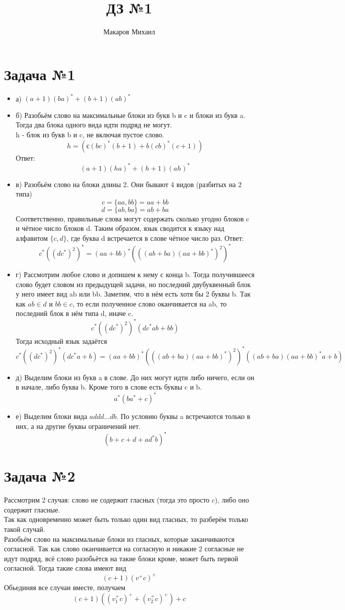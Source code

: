 \documentclass{article}
\title{ДЗ №1}
\author{Макаров Михаил}
\date{}
\begin{document}
	\maketitle
	\section{Задача №1}
	\begin{itemize}
	\item а) \( (a + 1)(ba)^* + (b + 1)(ab)^* \)
	\item б) Разобьём слово на максимальные блоки из букв b и c и блоки из букв a.
	Тогда два блока одного вида идти подряд не могут.\\
	h - блок из букв b и c, не включая пустое слово.
	\[ 
		h = (с(bc)^*(b + 1) + b(cb)^*(c + 1))
	\]
	Ответ:
	\[
		(a + 1)(ha)^* + (h + 1)(ah)^*
	\]
	\item в) Разобьём слово на блоки длины 2. Они бывают 4 видов (разбитых на 2 типа)
	\[
		c = \{ aa, bb \} = aa + bb
	\]
	\[
		d = \{ ab, ba \} = ab + ba
	\]
	Соответственно, правильные слова могут содержать сколько угодно блоков c и чётное число блоков d.
	Таким образом, язык сводится к языку над алфавитом $ \{c, d\} $, где буква d встречается в слове чётное число раз.
	Ответ:
	\[
		c^*((dc^*)^2)^* = (aa + bb)^*(((ab + ba)(aa + bb)^*)^2)^*
	\]
	\item г) Рассмотрим любое слово и допишем к нему с конца b. Тогда получившееся слово будет 
	словом из предыдущей задачи, но последний двубуквенный блок у него имеет вид ab или bb.
	Заметим, что в нём есть хотя бы 2 буквы b. Так как $ ab \in d $ и $ bb \in c $, то если полученное
	слово оканчивается на ab, то последний блок в нём типа d, иначе c.
	\[
		c^*((dc^*)^2)^*(dc^*ab + bb)
	\]
	Тогда исходный язык задаётся
	\[
		c^*((dc^*)^2)^*(dc^*a + b) = (aa + bb)^*(((ab + ba)(aa + bb)^*)^2)^*((ab + ba)(aa + bb)^*a + b)
	\]
	\item д) Выделим блоки из букв a в слове. До них могут идти либо ничего, если он в начале,
	либо буква b. Кроме того в слове есть буквы c и b.
	\[
		a^*(ba^* + c)^*
	\]
	\item е) Выделим блоки вида $ addd \ldots db$. По условию буквы a встречаются только в них, а на другие буквы ограничений нет.
	\[
		(b + c + d + ad^*b)^*
	\]
	\end{itemize}
	
	\section{Задача №2}
	Рассмотрим 2 случая: слово не содержит гласных (тогда это просто $c$),
	либо оно содержит гласные.\\
	Так как одновременно может быть только один вид гласных, то разберём только такой случай.\\
	Разобьём слово на максимальные блоки из гласных, которые заканчиваются согласной.
	Так как слово оканчивается на согласную и никакие 2 согласные не идут подряд,
	всё слово разобьётся на такие блоки кроме, может быть первой согласной. Тогда такие слова имеют вид
	\[
		(c + 1)(v^+c)^+
	\]
	Обьединяя все случаи вместе, получаем
	\[
		(c + 1)((v_1^+c)^+ + (v_2^+c)^+) + c
	\]
	
\end{document}
